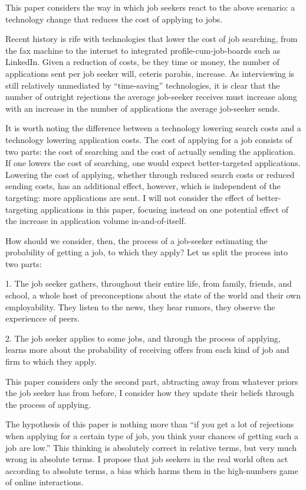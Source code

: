 \documentclass[a4paper,12pt]{article}
\begin{document}
This paper considers the way in which job seekers react to the above scenario: a technology change that reduces the cost of applying to jobs.

Recent history is rife with technologies that lower the cost of job searching, from the fax machine to the internet to integrated profile-cum-job-boards such as LinkedIn. Given a reduction of costs, be they time or money, the number of applications sent per job seeker will, ceteris parabis, increase. As interviewing is still relatively unmediated by ``time-saving'' technologies, it is clear that the number of outright rejections the average job-seeker receives must increase along with an increase in the number of applications the average job-seeker sends.

It is worth noting the difference between a technology lowering search costs and a technology lowering application costs. The cost of applying for a job consists of two parts: the cost of searching and the cost of actually sending the application. If one lowers the cost of searching, one would expect better-targeted applications. Lowering the cost of applying, whether through reduced search costs or reduced sending costs, has an additional effect, however, which is independent of the targeting: more applications are sent. I will not consider the effect of better-targeting applications in this paper, focusing instead on one potential effect of the increase in application volume in-and-of-itself.

How should we consider, then, the process of a job-seeker estimating the probability of getting a job, to which they apply? Let us split the process into two parts:

1. The job seeker gathers, throughout their entire life, from family, friends, and school, a whole host of preconceptions about the state of the world and their own employability. They listen to the news, they hear rumors, they observe the experiencce of peers.

2. The job seeker applies to some jobs, and through the process of applying, learns more about the probability of receiving offers from each kind of job and firm to which they apply.

This paper considers only the second part, abtracting away from whatever priors the job seeker has from before, I consider how they update their beliefs through the process of applying.

The hypothesis of this paper is nothing more than ``if you get a lot of rejections when applying for a certain type of job, you think your chances of getting such a job are low.'' This thinking is absolutely correct in relative terms, but very much wrong in absolute terms. I propose that job seekers in the real world often act according to absolute terms, a bias which harms them in the high-numbers game of online interactions.
\end{document}
